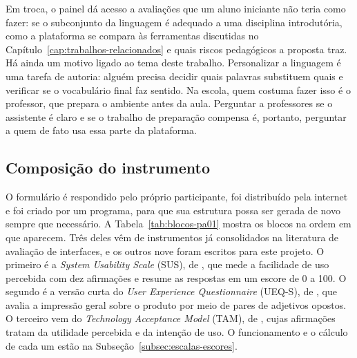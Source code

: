 Em troca, o painel dá acesso a avaliações que um aluno iniciante não teria como fazer: se o subconjunto da linguagem é adequado a uma disciplina introdutória, como a plataforma se compara às ferramentas discutidas no Capítulo~\ref{cap:trabalhos-relacionados} e quais riscos pedagógicos a proposta traz. Há ainda um motivo ligado ao tema deste trabalho. Personalizar a linguagem é uma tarefa de autoria: alguém precisa decidir quais palavras substituem quais e verificar se o vocabulário final faz sentido. Na escola, quem costuma fazer isso é o professor, que prepara o ambiente antes da aula. Perguntar a professores se o assistente é claro e se o trabalho de preparação compensa é, portanto, perguntar a quem de fato usa essa parte da plataforma.

\subsection{Composição do instrumento}

O formulário é respondido pelo próprio participante, foi distribuído pela internet e foi criado por um programa, para que sua estrutura possa ser gerada de novo sempre que necessário. A Tabela~\ref{tab:blocos-pa01} mostra os blocos na ordem em que aparecem. Três deles vêm de instrumentos já consolidados na literatura de avaliação de interfaces, e os outros nove foram escritos para este projeto. O primeiro é a \textit{System Usability Scale} (SUS), de , que mede a facilidade de uso percebida com dez afirmações e resume as respostas em um escore de 0 a 100. O segundo é a versão curta do \textit{User Experience Questionnaire} (UEQ-S), de , que avalia a impressão geral sobre o produto por meio de pares de adjetivos opostos. O terceiro vem do \textit{Technology Acceptance Model} (TAM), de , cujas afirmações tratam da utilidade percebida e da intenção de uso. O funcionamento e o cálculo de cada um estão na Subseção~\ref{subsec:escalas-escores}.


